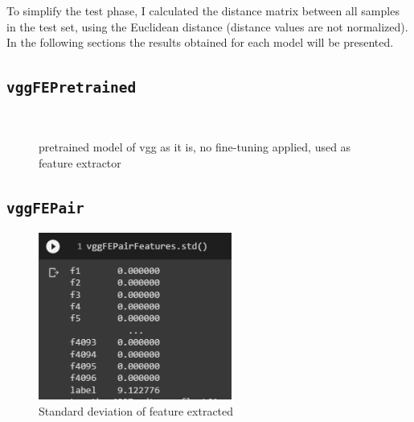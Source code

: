 \documentclass{article}
\begin{document}
To simplify the test phase, I calculated the distance matrix between all samples in the test set, using the Euclidean distance (distance values are not normalized). In the following sections the results obtained for each model will be presented.

\subsection{\texttt{vggFEPretrained}}
\begin{figure}[H]
    \centering
    \\
    \caption{pretrained model of vgg as it is, no fine-tuning applied, used as feature extractor}
    \label{fig:vggFEPretrainedRes}
\end{figure}

\subsection{\texttt{vggFEPair}}

\begin{figure}[H]
    \centering
    \includegraphics[width=2.5in]{imgs/vggFEPairStd.PNG}
    \caption{Standard deviation of feature extracted}
    \label{fig:vggFEPairStd}
\end{figure}
\end{document}
